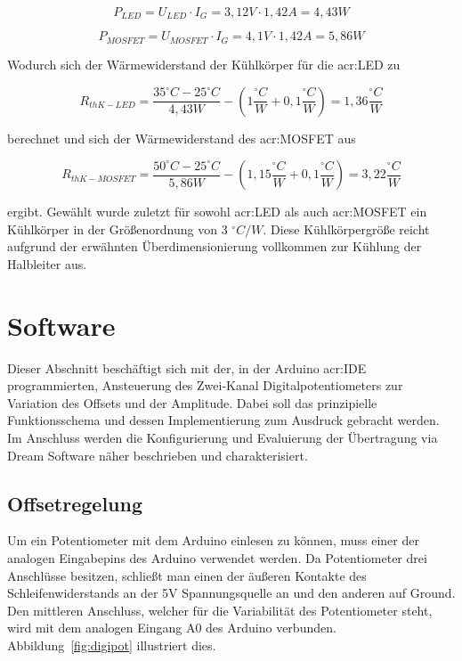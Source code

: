 \begin{equation}
	\label{equ:thermoled}
	P_{LED} = U_{LED} \cdot I_{G} = 3,12V \cdot 1,42A= 4,43W
\end{equation}

\begin{equation}
	\label{equ:thermomos}
	P_{MOSFET} = U_{MOSFET} \cdot I_{G} = 4,1V \cdot 1,42A= 5,86W
\end{equation}

Wodurch sich der Wärmewiderstand der Kühlkörper für die \gls{acr:LED} zu

\begin{equation}
	\label{equ:thermo2}
	R_{thK-LED} = \frac{35 ^\circ C - 25 ^\circ C}{4,43W}-(1 \frac{^\circ C}{W}+0,1 \frac{^\circ C}{W}) = 1,36\frac{^\circ C}{W}
\end{equation}

berechnet und sich der Wärmewiderstand des \gls{acr:MOSFET} aus
 
\begin{equation}
	\label{equ:thermo3}
	R_{thK-MOSFET} = \frac{50 ^\circ C - 25 ^\circ C}{5,86W}-(1,15 \frac{^\circ C}{W}+0,1 \frac{^\circ C}{W}) = 3,22\frac{^\circ C}{W}
\end{equation}

ergibt. Gewählt wurde zuletzt für sowohl \gls{acr:LED} als auch \gls{acr:MOSFET} ein Kühlkörper in der Größenordnung von 3 $^\circ C/W$. Diese Kühlkörpergröße reicht aufgrund der erwähnten Überdimensionierung vollkommen zur Kühlung der Halbleiter aus. 

\newpage
\section{Software}
\label{sec:Software}

Dieser Abschnitt beschäftigt sich mit der, in der Arduino \gls{acr:IDE} programmierten, Ansteuerung des Zwei-Kanal Digitalpotentiometers zur Variation des Offsets und der Amplitude. Dabei soll das prinzipielle Funktionsschema und dessen Implementierung zum Ausdruck gebracht werden. Im Anschluss werden die Konfigurierung und Evaluierung der Übertragung via Dream Software näher beschrieben und charakterisiert.

\subsection{Offsetregelung}
\label{subsec:offset}
Um ein Potentiometer mit dem Arduino einlesen zu können, muss einer der analogen Eingabepins des Arduino verwendet werden. Da Potentiometer drei Anschlüsse besitzen, schließt man einen der äußeren Kontakte des Schleifenwiderstands an der 5V Spannungsquelle an und den anderen auf Ground. Den mittleren Anschluss, welcher für die Variabilität des Potentiometer steht, wird mit dem analogen Eingang A0 des Arduino verbunden. Abbildung~\ref{fig:digipot} illustriert dies. 

